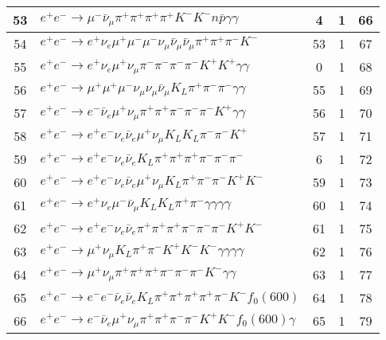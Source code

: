 \documentclass[landscape]{article}
\begin{document}
\begin{table}[htbp!]
\begin{tabular}{|c|>{\centering}p{18cm}|c|c|c|}
\hline
53 & $ e^{+} e^{-} \rightarrow \mu^{-} \bar{\nu}_{\mu} \pi^{+} \pi^{+} \pi^{+} \pi^{+} K^{-} K^{-} n \bar{p} \gamma \gamma $ & 4 & 1 & 66 \\
\hline
54 & $ e^{+} e^{-} \rightarrow e^{+} \nu_{e} \mu^{+} \mu^{-} \mu^{-} \nu_{\mu} \bar{\nu}_{\mu} \bar{\nu}_{\mu} \pi^{+} \pi^{+} \pi^{-} K^{-} $ & 53 & 1 & 67 \\
\hline
55 & $ e^{+} e^{-} \rightarrow e^{+} \nu_{e} \mu^{+} \nu_{\mu} \pi^{-} \pi^{-} \pi^{-} \pi^{-} K^{+} K^{+} \gamma \gamma $ & 0 & 1 & 68 \\
\hline
56 & $ e^{+} e^{-} \rightarrow \mu^{+} \mu^{+} \mu^{-} \nu_{\mu} \nu_{\mu} \bar{\nu}_{\mu} K_{L} \pi^{+} \pi^{-} \pi^{-} \gamma \gamma $ & 55 & 1 & 69 \\
\hline
57 & $ e^{+} e^{-} \rightarrow e^{-} \bar{\nu}_{e} \mu^{+} \nu_{\mu} \pi^{+} \pi^{+} \pi^{-} \pi^{-} \pi^{-} K^{+} \gamma \gamma $ & 56 & 1 & 70 \\
\hline
58 & $ e^{+} e^{-} \rightarrow e^{+} e^{-} \nu_{e} \bar{\nu}_{e} \mu^{+} \nu_{\mu} K_{L} K_{L} \pi^{-} \pi^{-} K^{+} $ & 57 & 1 & 71 \\
\hline
59 & $ e^{+} e^{-} \rightarrow e^{+} e^{-} \nu_{e} \bar{\nu}_{e} K_{L} \pi^{+} \pi^{+} \pi^{+} \pi^{-} \pi^{-} \pi^{-} $ & 6 & 1 & 72 \\
\hline
60 & $ e^{+} e^{-} \rightarrow e^{+} e^{-} \nu_{e} \bar{\nu}_{e} \mu^{+} \nu_{\mu} K_{L} \pi^{+} \pi^{-} \pi^{-} K^{+} K^{-} $ & 59 & 1 & 73 \\
\hline
61 & $ e^{+} e^{-} \rightarrow e^{+} \nu_{e} \mu^{-} \bar{\nu}_{\mu} K_{L} K_{L} \pi^{+} \pi^{-} \gamma \gamma \gamma \gamma $ & 60 & 1 & 74 \\
\hline
62 & $ e^{+} e^{-} \rightarrow e^{+} e^{-} \nu_{e} \bar{\nu}_{e} \pi^{+} \pi^{+} \pi^{+} \pi^{-} \pi^{-} \pi^{-} K^{+} K^{-} $ & 61 & 1 & 75 \\
\hline
63 & $ e^{+} e^{-} \rightarrow \mu^{+} \nu_{\mu} K_{L} \pi^{+} \pi^{-} K^{+} K^{-} K^{-} \gamma \gamma \gamma \gamma $ & 62 & 1 & 76 \\
\hline
64 & $ e^{+} e^{-} \rightarrow \mu^{+} \nu_{\mu} \pi^{+} \pi^{+} \pi^{+} \pi^{-} \pi^{-} \pi^{-} K^{-} \gamma \gamma $ & 63 & 1 & 77 \\
\hline
65 & $ e^{+} e^{-} \rightarrow e^{-} e^{-} \bar{\nu}_{e} \bar{\nu}_{e} K_{L} \pi^{+} \pi^{+} \pi^{+} \pi^{+} \pi^{-} K^{-} f_{0}(600) $ & 64 & 1 & 78 \\
\hline
66 & $ e^{+} e^{-} \rightarrow e^{-} \bar{\nu}_{e} \mu^{+} \nu_{\mu} \pi^{+} \pi^{+} \pi^{-} \pi^{-} K^{+} K^{-} f_{0}(600) \gamma $ & 65 & 1 & 79 \\

\end{tabular}
\end{table}
\end{document}

